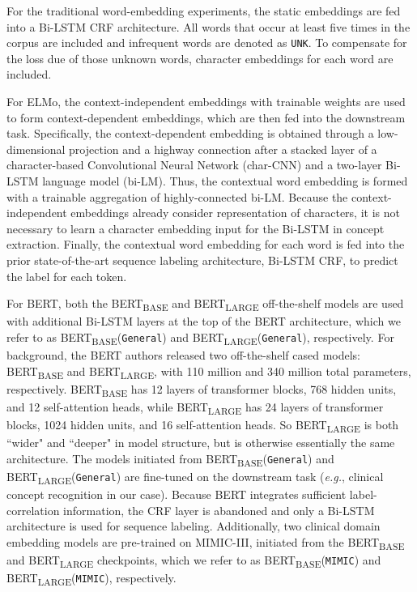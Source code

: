 \documentclass[11pt,a4paper]{article}
\begin{document}
For the traditional word-embedding experiments, the static embeddings are fed into a Bi-LSTM CRF architecture. All words that occur at least five times in the corpus are included and infrequent words are denoted as \texttt{UNK}. To compensate for the loss due of those unknown words, character embeddings for each word are included.

For ELMo, the context-independent embeddings with trainable weights are used to form context-dependent embeddings, which are then fed into the downstream task. Specifically, the context-dependent embedding is obtained through a low-dimensional projection and a highway connection after a stacked layer of a character-based Convolutional Neural Network (char-CNN) and a two-layer Bi-LSTM language model (bi-LM).  Thus, the contextual word embedding is formed with a trainable aggregation of highly-connected bi-LM. Because the context-independent embeddings already consider representation of characters, it is not necessary to learn a character embedding input for the Bi-LSTM in concept extraction. Finally, the contextual word embedding for each word is fed into the prior state-of-the-art sequence labeling architecture, Bi-LSTM CRF, to predict the label for each token.

For BERT, both the BERT\textsubscript{BASE} and BERT\textsubscript{LARGE} off-the-shelf models are used with additional Bi-LSTM layers at the top of the BERT architecture, which we refer to as
BERT\textsubscript{BASE}(\verb|General|) and BERT\textsubscript{LARGE}(\verb|General|), respectively. For background, the BERT authors released two off-the-shelf cased models: BERT\textsubscript{BASE} and BERT\textsubscript{LARGE}, with 110 million and 340 million total parameters, respectively. BERT\textsubscript{BASE} has 12 layers of transformer blocks, 768 hidden units, and 12 self-attention heads, while BERT\textsubscript{LARGE} has 24 layers of transformer blocks, 1024 hidden units, and 16 self-attention heads. So BERT\textsubscript{LARGE} is both ``wider" and ``deeper" in model structure, but is otherwise essentially the same architecture. The models initiated from BERT\textsubscript{BASE}(\verb|General|) and BERT\textsubscript{LARGE}(\verb|General|) are fine-tuned on the downstream task (\emph{e.g.}, clinical concept recognition in our case). Because BERT integrates sufficient label-correlation information, the CRF layer is abandoned and only a Bi-LSTM architecture is used for sequence labeling. Additionally, two clinical domain embedding models are pre-trained on MIMIC-III, initiated from the BERT\textsubscript{BASE} and BERT\textsubscript{LARGE} checkpoints, which we refer to as BERT\textsubscript{BASE}(\verb|MIMIC|) and BERT\textsubscript{LARGE}(\verb|MIMIC|), respectively. 
\end{document}

